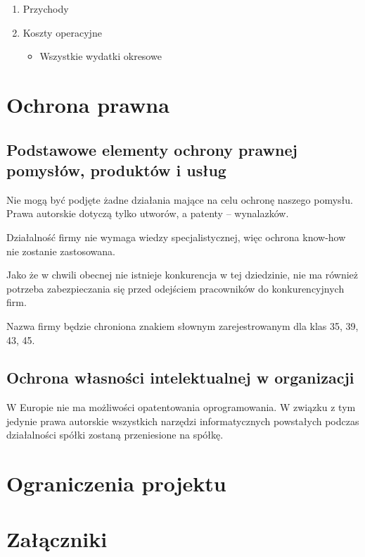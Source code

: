 \documentclass{article}
\begin{document}
\begin{enumerate}
\item Przychody

\item Koszty operacyjne
\begin{itemize}
\item Wszystkie wydatki okresowe 
\end{itemize}

\end{enumerate}

\section{Ochrona prawna}
\subsection{Podstawowe elementy ochrony prawnej pomysłów, produktów i usług}
Nie mogą być podjęte żadne działania mające na celu ochronę naszego pomysłu. Prawa autorskie dotyczą tylko utworów, a patenty -- wynalazków. 

Działalność firmy nie wymaga wiedzy specjalistycznej, więc ochrona know-how nie zostanie zastosowana.

Jako że w chwili obecnej nie istnieje konkurencja w tej dziedzinie, nie ma również potrzeba zabezpieczania się przed odejściem pracowników do konkurencyjnych firm.

Nazwa firmy będzie chroniona znakiem słownym zarejestrowanym dla klas 35, 39, 43, 45.
\subsection{Ochrona własności intelektualnej w organizacji}
W Europie nie ma możliwości opatentowania oprogramowania. W związku z tym jedynie prawa autorskie wszystkich narzędzi informatycznych powstałych podczas działalności spółki zostaną przeniesione na spółkę.

\section{Ograniczenia projektu}


\section{Załączniki}
\end{document}
